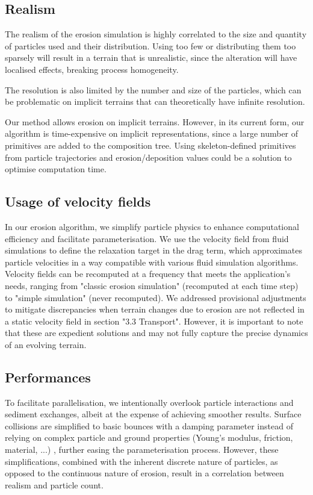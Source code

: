 \subsection{Realism}
The realism of the erosion simulation is highly correlated to the size and quantity of particles used and their distribution. Using too few or distributing them too sparsely will result in a terrain that is unrealistic, since the alteration will have localised effects, breaking process homogeneity.

The resolution is also limited by the number and size of the particles, which can be problematic on implicit terrains that can theoretically have infinite resolution.

Our method allows erosion on implicit terrains. However, in its current form, our algorithm is time-expensive on implicit representations, since a large number of primitives are added to the composition tree. Using skeleton-defined primitives \cite{Hong2013, Rigaudiere2000} from particle trajectories and erosion/deposition values could be a solution to optimise computation time.

\subsection{Usage of velocity fields}
In our erosion algorithm, we simplify particle physics to enhance computational efficiency and facilitate parameterisation. We use the velocity field from fluid simulations to define the relaxation target in the drag term, which approximates particle velocities in a way compatible with various fluid simulation algorithms. Velocity fields can be recomputed at a frequency that meets the application's needs, ranging from "classic erosion simulation" (recomputed at each time step) to "simple simulation" (never recomputed). We addressed provisional adjustments to mitigate discrepancies when terrain changes due to erosion are not reflected in a static velocity field in section "3.3 Transport". However, it is important to note that these are expedient solutions and may not fully capture the precise dynamics of an evolving terrain.

\subsection{Performances}
To facilitate parallelisation, we intentionally overlook particle interactions and sediment exchanges, albeit at the expense of achieving smoother results. Surface collisions are simplified to basic bounces with a damping parameter instead of relying on complex particle and ground properties (Young's modulus, friction, material, ...) \cite{Yan2020}, further easing the parameterisation process. However, these simplifications, combined with the inherent discrete nature of particles, as opposed to the continuous nature of erosion, result in a correlation between realism and particle count.

